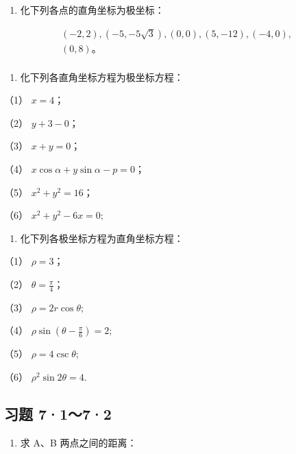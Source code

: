 \begin{enumerate}
\def\labelenumi{\arabic{enumi}.}
\setcounter{enumi}{1}
\tightlist
\item
  化下列各点的直角坐标为极坐标：
\end{enumerate}

\[
\begin{array}{l} (- 2, 2), (- 5, - 5 \sqrt {3}), (0, 0), (5, - 12), (- 4, 0), \\ (0, 8)\text{。} \\ \end{array}
\]

\begin{enumerate}
\def\labelenumi{\arabic{enumi}.}
\setcounter{enumi}{2}
\tightlist
\item
  化下列各直角坐标方程为极坐标方程：
\end{enumerate}

（1） \(x = 4\)；

（2） \(y + 3 - 0\)；

（3） \(x + y = 0\)；

（4） \(x \cos \alpha + y \sin \alpha - p = 0\)；

（5） \(x^{2} + y^{2} = 16\)；

（6） \(x^{2} + y^{2} - 6x = 0;\)

\begin{enumerate}
\def\labelenumi{\arabic{enumi}.}
\setcounter{enumi}{3}
\tightlist
\item
  化下列各极坐标方程为直角坐标方程：
\end{enumerate}

（1） \(\rho = 3\)；

（2） \(\theta = \frac{\pi}{4}\)；

（3） \(\rho = 2r\cos \theta ;\)

（4） \(\rho \sin \left( \theta - \frac{\pi}{6} \right) = 2;\)

（5） \(\rho = 4\csc \theta ;\)

（6） \(\rho^2\sin 2\theta = 4.\)

\subsection{习题 7·1～7·2}\label{ux4e60ux9898-7172}

\begin{enumerate}
\def\labelenumi{\arabic{enumi}.}
\tightlist
\item
  求 A、B 两点之间的距离：
\end{enumerate}

